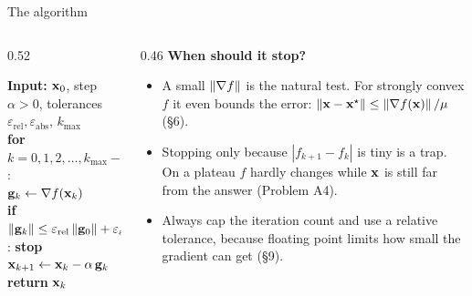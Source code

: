 \begin{frame}{The algorithm}
  \begin{columns}[T]
    \begin{column}{0.52\textwidth}
      \begin{thmbox}
        \small
        \textbf{Input:} $\mathbf{x}_0$, step $\alpha>0$, tolerances $\varepsilon_{\text{rel}},\varepsilon_{\text{abs}}$, $k_{\max}$\\[2pt]
        \textbf{for} $k = 0,1,2,\dots,k_{\max}-1$:\\
        \quad $\mathbf{g}_k \gets \nabla f(\mathbf{x}_k)$\\
        \quad \textbf{if} $\left\lVert \mathbf{g}_k \right\rVert\le\varepsilon_{\text{rel}}\left\lVert \mathbf{g}_0 \right\rVert+\varepsilon_{\text{abs}}$: \textbf{stop}\\
        \quad $\mathbf{x}_{k+1}\gets\mathbf{x}_k - \alpha\,\mathbf{g}_k$\\
        \textbf{return} $\mathbf{x}_k$
      \end{thmbox}
    \end{column}
    \begin{column}{0.46\textwidth}
      \small\textbf{When should it stop?}
      \begin{itemize}\footnotesize
        \item A small $\left\lVert \nabla f \right\rVert$ is the natural test. For strongly convex $f$ it even bounds the error:
              $\left\lVert \mathbf{x}-\mathbf{x}^\star \right\rVert\le\left\lVert \nabla f(\mathbf{x}) \right\rVert/\mu$ (\S6).
        \item Stopping only because $|f_{k+1}-f_k|$ is tiny is a trap. On a plateau $f$ hardly changes
              while $\mathbf{x}$ is still far from the answer (Problem A4).
        \item Always cap the iteration count and use a relative tolerance, because floating point limits
              how small the gradient can get (\S9).
      \end{itemize}
    \end{column}
  \end{columns}
\end{frame}

